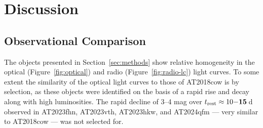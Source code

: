 \documentclass[twocolumn,twocolappendix, linenumbers, trackchanges]{aastex7}
\begin{document}




\section{Discussion}
\label{sec:discussion}

\subsection{Observational Comparison}
\label{sec:comparison}

The objects presented in Section~\ref{sec:methods} show relative homogeneity in the optical (Figure~\ref{fig:optical}) and radio (Figure~\ref{fig:radio-lc}) light curves. To some extent the similarity of the optical light curves to those of AT2018cow is by selection, as these objects were identified on the basis of a rapid rise and decay  along with high luminosities. %
The rapid decline of 3--4 mag over $t_\mathrm{rest}\approx10\bf{-15}$\,d observed in AT2023fhn, AT2023vth, AT2023hkw, and AT2024qfm --- very similar to AT2018cow --- was not selected for.  
\end{document}
